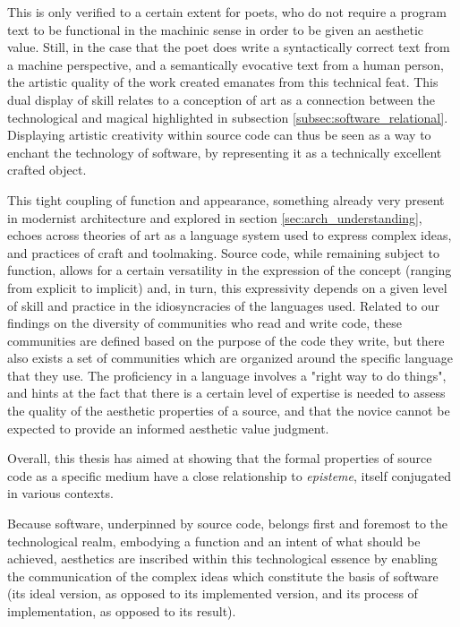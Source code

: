 This is only verified to a certain extent for poets, who do not require a program text to be functional in the machinic sense in order to be given an aesthetic value. Still, in the case that the poet does write a syntactically correct text from a machine perspective, and a semantically evocative text from a human person, the artistic quality of the work created emanates from this technical feat. This dual display of skill relates to a conception of art as a connection between the technological and magical highlighted in subsection \ref{subsec:software_relational}. Displaying artistic creativity within source code can thus be seen as a way to enchant the technology of software, by representing it as a technically excellent crafted object.

This tight coupling of function and appearance, something already very present in modernist architecture and explored in section \ref{sec:arch_understanding}, echoes across theories of art as a language system used to express complex ideas, and practices of craft and toolmaking. Source code, while remaining subject to function, allows for a certain versatility in the expression of the concept (ranging from explicit to implicit) and, in turn, this expressivity depends on a given level of skill and practice in the idiosyncracies of the languages used. Related to our findings on the diversity of communities who read and write code, these communities are defined based on the purpose of the code they write, but there also exists a set of communities which are organized around the specific language that they use. The proficiency in a language involves a "right way to do things", and hints at the fact that there is a certain level of expertise is needed to assess the quality of the aesthetic properties of a source, and that the novice cannot be expected to provide an informed aesthetic value judgment.

Overall, this thesis has aimed at showing that the formal properties of source code as a specific medium have a close relationship to \emph{episteme}, itself conjugated in various contexts.

Because software, underpinned by source code, belongs first and foremost to the technological realm, embodying a function and an intent of what should be achieved, aesthetics are inscribed within this technological essence by enabling the communication of the complex ideas which constitute the basis of software (its ideal version, as opposed to its implemented version, and its process of implementation, as opposed to its result).

